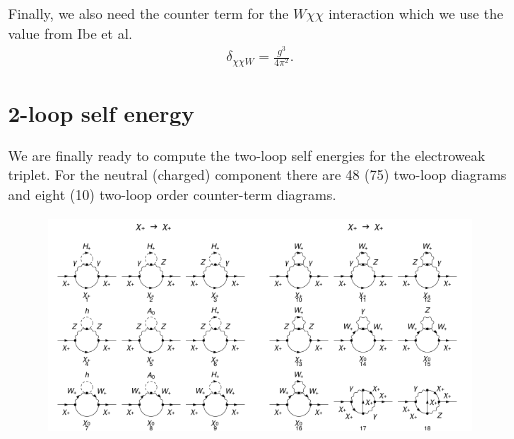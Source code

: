 \documentclass[11pt]{article}
\begin{document}
Finally, we also need the counter term for the $W\chi\chi$ interaction which we use the value from Ibe et al.
\begin{align}
\delta_{\chi\chi W} = \frac{g^3}{4 \pi^2}.
\end{align}

\subsection{2-loop self energy}

We are finally ready to compute the two-loop self energies for the electroweak triplet.  For the neutral (charged) component there are 48 (75) two-loop diagrams and eight (10) two-loop order counter-term diagrams.  



\begin{figure}[h!]
\center
\includegraphics[width=0.5\textwidth]{diagrams_F[1]_2_1.pdf}\includegraphics[width=0.5\textwidth]{diagrams_F[1]_2_2.pdf}

\end{figure}
\end{document}
